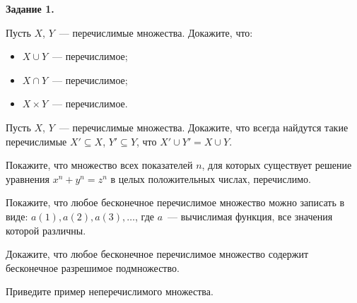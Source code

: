 \setcounter{curtask}{1}

\begin{center}
    \bf Задание 1.
\end{center}

\begin{task}
    Пусть $X$, $Y$~--- перечислимые множества. Докажите, что:
    \begin{itemize}
            \item $X \cup Y$~--- перечислимое;
	        \item $X \cap Y$~--- перечислимое;
        	\item $X \times Y$~--- перечислимое.
    \end{itemize}
\end{task}

\begin{task}
    Пусть $X$, $Y$~--- перечислимые множества. Докажите, что всегда
    найдутся такие перечислимые $X' \subseteq X$, $Y' \subseteq Y$,
    что $X' \cup Y' = X \cup Y$.
\end{task}

\begin{task}
    Покажите, что множество всех показателей $n$, для которых
    существует решение уравнения $x^n + y^n = z^n$ в целых положительных числах,
    перечислимо.
\end{task}

\begin{task}
    Покажите, что любое бесконечное перечислимое множество можно
    записать в виде: ${a(1), a(2), a(3), \dots}$, где $a$~---
    вычислимая функция, все значения которой различны.
\end{task}

\begin{task}
    Докажите, что любое бесконечное перечислимое множество содержит
    бесконечное разрешимое подмножество.
\end{task}

\begin{task}
    Приведите пример неперечислимого множества.
\end{task}
